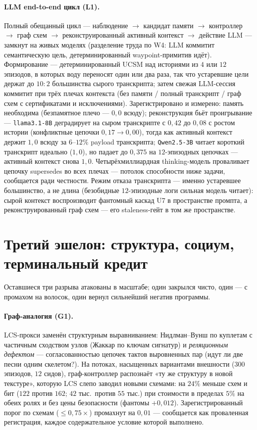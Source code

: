 \documentclass{article}
\begin{document}
\paragraph{LLM end-to-end цикл (L1).} Полный обещанный цикл ---
наблюдение $\to$ кандидат памяти $\to$ контроллер $\to$ граф схем
$\to$ реконструированный активный контекст $\to$ действие LLM ---
замкнут на живых моделях (разделение труда по W4: LLM коммитит
семантическую цель, детерминированный waypoint-примитив идёт).
Формирование --- детерминированный UCSM над историями из $4$ или
$12$ эпизодов, в которых воду переносят один или два раза, так что
устаревшие цели держат до $10{:}2$ большинства сырого транскрипта;
затем свежая LLM-сессия коммитит при трёх плечах контекста (без
памяти / полный транскрипт / граф схем с сертификатами и
исключениями). Зарегистрировано и измерено: память необходима
(безпамятное плечо --- $0{,}0$ всюду); реконструкция бьёт
проигрывание --- \texttt{llama3.1-8B} деградирует на сыром
транскрипте с $0{,}42$ до $0{,}08$ с ростом истории (конфликтные
цепочки $0{,}17 \to 0{,}00$), тогда как активный контекст держит
$1{,}0$ всюду за $6$--$12\%$ payload транскрипта;
\texttt{Qwen2.5-3B} читает короткий транскрипт идеально ($1{,}0$), но
падает до $0{,}375$ на $12$-эпизодных цепочках --- активный контекст
снова $1{,}0$. Четырёхмиллиардная thinking-модель проваливает цепочку
supersedes во всех плечах --- потолок способности ниже задачи,
сообщается ради честности. Режим отказа транскрипта --- именно
устаревшее большинство, а не длина (безобидные $12$-эпизодные логи
сильная модель читает): сырой контекст воспроизводит фантомный каскад
U7 в пространстве промпта, а реконструированный граф схем --- его
staleness-гейт в том же пространстве.


\section{Третий эшелон: структура, социум, терминальный кредит}
\label{p5:sec:echelon3}

Оставшиеся три разрыва атакованы в масштабе; один закрылся чисто,
один --- с промахом на волосок, один вернул сильнейший негатив
программы.

\paragraph{Граф-аналогия (G1).} LCS-прокси заменён структурным
выравниванием: Нидлман--Вунш по куплетам с частичным сходством узлов
(Жаккар по ключам сигнатур) и \emph{реляционным дефектом} ---
согласованностью цепочек тактов выровненных пар (идут ли две песни
одним скелетом?). На потоках, насыщенных вариантами внешности
($300$ эпизодов, $12$ сидов), граф-контроллер распознаёт «ту же
структуру в новой текстуре», которую LCS слепо заводил новыми
схемами: на $24\%$ меньше схем и бит ($122$ против $162$; $42$ тыс.\
против $55$ тыс.) при стоимости в пределах $5\%$ на обеих ролях и
без цены безопасности (фантомы $+0{,}012$). Зарегистрированный порог
по схемам ($\le 0{,}75\times$) промахнут на $0{,}01$ --- сообщается
как проваленная регистрация, каждое содержательное условие которой
выполнено.
\end{document}
